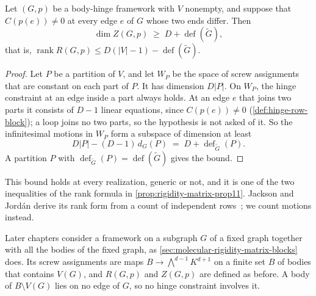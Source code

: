 \begin{lemma}
  \label{lem:deficiency-rank-bound}
  \leanok
  Let $(G,p)$ be a body-hinge framework with $V$ nonempty, and suppose
  that $C(p(e)) \neq 0$ at every edge $e$ of $G$ whose two ends differ.
  Then
  \[
    \dim Z(G,p) \;\ge\; D + \operatorname{def}(\tilde G),
  \]
  that is,
  $\operatorname{rank} R(G,p) \le D(|V|-1) - \operatorname{def}(\tilde G)$.
\end{lemma}
\begin{proof}
  \leanok
  Let $P$ be a partition of $V$, and let $W_P$ be the space of screw
  assignments that are constant on each part of $P$. It has dimension
  $D|P|$. On $W_P$, the hinge constraint at an edge inside a part always
  holds. At an edge $e$ that joins two parts it consists of $D - 1$
  linear equations, since $C(p(e)) \neq 0$ (\cref{def:hinge-row-block});
  a loop joins no two parts, so the hypothesis is not asked of it. So
  the infinitesimal motions in $W_P$ form a subspace of dimension at
  least
  \[
    D|P| - (D-1)\,d_G(P) \;=\; D + \operatorname{def}_{\tilde G}(P).
  \]
  A partition $P$ with
  $\operatorname{def}_{\tilde G}(P) = \operatorname{def}(\tilde G)$
  gives the bound.
\end{proof}

This bound holds at every realization, generic or not, and it is
one of the two inequalities of the rank formula in
\cref{prop:rigidity-matrix-prop11}. Jackson and Jord\'an derive its
rank form from a count of independent
rows~\cite[\S4]{jacksonJordan2009}; we count motions instead.

Later chapters consider a framework on a subgraph $G$ of a fixed graph
together with all the bodies of the fixed graph, as
\cref{sec:molecular-rigidity-matrix-blocks} does. Its screw assignments
are maps $B \to \bigwedge^{d-1}K^{d+1}$ on a finite set $B$ of bodies
that contains $V(G)$, and $R(G,p)$ and $Z(G,p)$ are defined as before.
A body of $B \setminus V(G)$ lies on no edge of $G$, so no hinge
constraint involves it.

